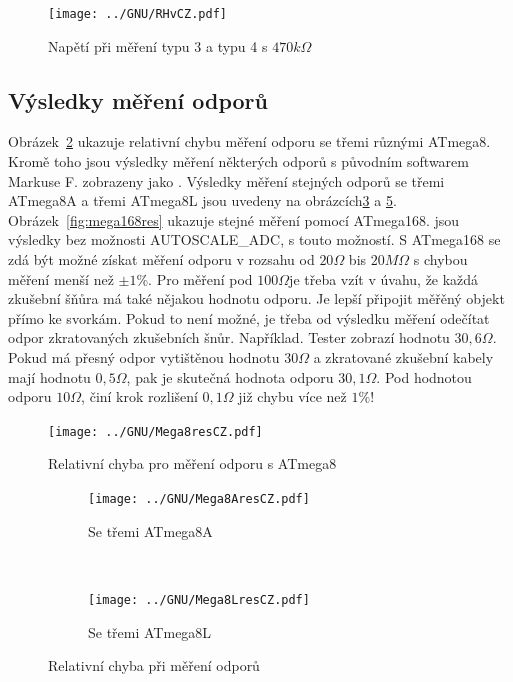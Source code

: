 \begin{figure}[H]
\centering
 \texttt{[image: ../GNU/RHvCZ.pdf]}
\caption{Napětí při měření typu 3 a typu 4 s \(470k\Omega\) }
\label{fig:RHv}
\end{figure}

\subsection{Výsledky měření odporů}
Obrázek~\ref{fig:mega8res}  ukazuje relativní chybu měření odporu se třemi různými ATmega8.
Kromě toho jsou výsledky měření některých odporů s původním softwarem Markuse F. zobrazeny jako .
Výsledky měření stejných odporů se třemi ATmega8A a třemi ATmega8L jsou uvedeny
na obrázcích\ref{fig:mega8Ares} a \ref{fig:mega8Lres}.
Obrázek~\ref{fig:mega168res} ukazuje stejné měření pomocí ATmega168.
 jsou výsledky bez možnosti AUTOSCALE\_ADC,  s touto možností.
S ATmega168 se zdá být možné získat měření odporu v rozsahu od \(20\Omega\) bis
\(20M\Omega\) s chybou měření menší než  \(\pm1\%\).
Pro měření pod \(100\Omega\)je třeba vzít v úvahu, že každá zkušební šňůra má také nějakou hodnotu odporu.
Je lepší připojit měřěný objekt přímo ke svorkám.
Pokud to není možné, je třeba od výsledku měření odečítat odpor zkratovaných zkušebních šnůr.
Například. Tester zobrazí hodnotu \(30,6\Omega\). Pokud má přesný odpor vytištěnou hodnotu \(30\Omega\)
a zkratované zkušební kabely mají hodnotu  \(0,5\Omega\), pak je skutečná hodnota odporu \(30,1\Omega\).
Pod hodnotou odporu \(10\Omega\), činí krok rozlišení \(0,1\Omega\) již chybu více než \(1\%\)!

\begin{figure}[H]
\centering
 \texttt{[image: ../GNU/Mega8resCZ.pdf]}
\caption{Relativní chyba pro měření odporu s ATmega8}
\label{fig:mega8res}
\end{figure}

\begin{figure}[H]
  \begin{subfigure}[b]{.5\textwidth}
    \centering
    \texttt{[image: ../GNU/Mega8AresCZ.pdf]}
    \caption{Se třemi ATmega8A}
    \label{fig:mega8Ares}
  \end{subfigure}
  ~
  \begin{subfigure}[b]{.5\textwidth}
    \centering
    \texttt{[image: ../GNU/Mega8LresCZ.pdf]}
    \caption{Se třemi ATmega8L}
    \label{fig:mega8Lres}
  \end{subfigure}
\caption{Relativní chyba při měření odporů}
\end{figure}

